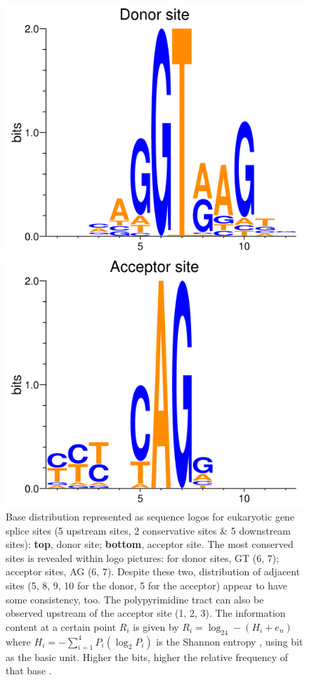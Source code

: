 \documentclass[journal,twoside]{IEEEtran}
\begin{document}
\begin{figure}[htbp]
\centerline{\includegraphics[scale=0.85]{Pics/donor_logo.png}}
\centerline{\includegraphics[scale=0.85]{Pics/acceptor_logo.png}}
\caption{Base distribution represented as sequence logos \cite{schneider1990sequence} for eukaryotic gene splice sites (5 upstream sites, 2 conservative sites \& 5 downstream sites): \textbf{top}, donor site; \textbf{bottom}, acceptor site. The most conserved sites is revealed within logo pictures: for donor sites, GT (6, 7); acceptor sites, AG (6, 7). Despite these two, distribution of adjacent sites (5, 8, 9, 10 for the donor, 5 for the acceptor) appear to have some consistency, too. The polypyrimidine tract can also be observed upstream of the acceptor site (1, 2, 3). The information content at a certain point $R_i$ is given by $R_i = \log_24 - (H_i + e_n)$ where $H_i = -\sum\limits_{i=1}^4{P_i(\log_2{P_i})}$ is the Shannon entropy \cite{shannon1948mathematical}, using bit as the basic unit. Higher the bits, higher the relative frequency of that base \cite{schneider1986information}. }
\label{fig1}
\end{figure}
\end{document}
